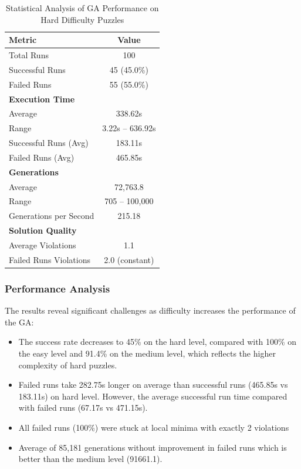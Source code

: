 \begin{table}[H]
\centering
\caption{Statistical Analysis of GA Performance on Hard Difficulty Puzzles}
\label{tab:hard_difficulty_stats}
\begin{tabular}{@{}lc@{}}
\toprule
\textbf{Metric} & \textbf{Value} \\
\midrule
Total Runs & 100 \\
Successful Runs & 45 (45.0\%) \\
Failed Runs & 55 (55.0\%) \\
\midrule
\textbf{Execution Time} & \\
Average & 338.62s \\
Range & 3.22s -- 636.92s \\
Successful Runs (Avg) & 183.11s \\
Failed Runs (Avg) & 465.85s \\
\midrule
\textbf{Generations} & \\
Average & 72,763.8 \\
Range & 705 -- 100,000 \\
Generations per Second & 215.18 \\
\midrule
\textbf{Solution Quality} & \\
Average Violations & 1.1 \\
Failed Runs Violations & 2.0 (constant) \\
\bottomrule
\end{tabular}
\end{table}

\subsubsection{Performance Analysis}
The results reveal significant challenges as difficulty increases the performance of the GA:
\begin{itemize}
    \item The success rate decreases to 45\% on the hard level, compared with 100\% on the easy level and 91.4\% on the medium level, which reflects the higher complexity of hard puzzles.
    \item Failed runs take 282.75s longer on average than successful runs (465.85s vs 183.11s) on hard level. However, the average successful run time compared with failed runs (67.17s vs 471.15s).
    \item All failed runs (100\%) were stuck at local minima with exactly 2 violations
    \item Average of 85,181 generations without improvement in failed runs which is better than the medium level (91661.1).
\end{itemize}

